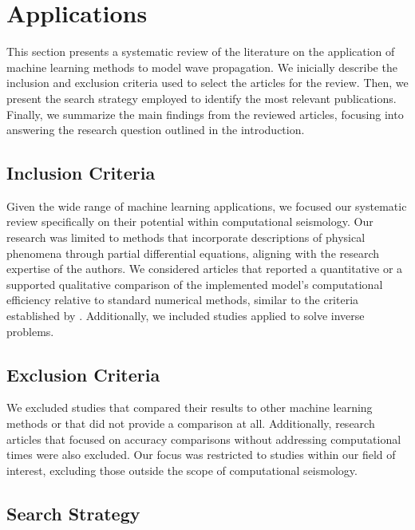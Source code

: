 \documentclass[11pt,twoside]{article}
\begin{document}
\section{Applications}\label{sec:applications}

This section presents a systematic review of the literature on the application of machine learning methods to model 
wave propagation. We inicially describe the inclusion and exclusion criteria used to select the articles for the review. 
Then, we present the search strategy employed to identify the most relevant publications. Finally, we summarize the
main findings from the reviewed articles, focusing into answering the research question outlined in the introduction.

\subsection*{Inclusion Criteria}

Given the wide range of machine learning applications, we focused our systematic review specifically on their potential 
within computational seismology. Our research was limited to methods that incorporate descriptions of physical phenomena 
through partial differential equations, aligning with the research expertise of the authors. We considered articles that 
reported a quantitative or a supported qualitative comparison of the implemented model's computational efficiency relative 
to standard numerical methods, similar to the criteria established by . Additionally, 
we included studies applied to solve inverse problems.

\subsection*{Exclusion Criteria}

We excluded studies that compared their results to other machine learning methods or that did not provide a comparison at 
all. Additionally, research articles that focused on accuracy comparisons without addressing computational times were also 
excluded. Our focus was restricted to studies within our field of interest, excluding those outside the scope of computational 
seismology.

\subsection*{Search Strategy}
\end{document}
